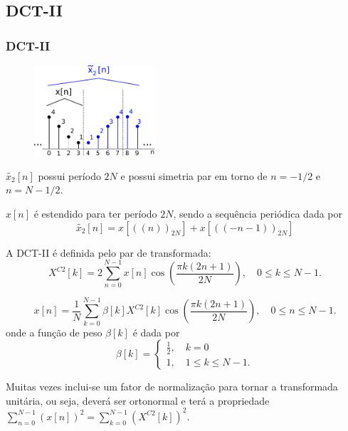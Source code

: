 \subsection{DCT-II}
\begin{frame}[allowframebreaks]
  \frametitle{DCT-II}
    \begin{figure}[ht]
    \centering
    \includegraphics[width=0.4\textwidth]{images/dct-2-ex.pdf}
    \label{fig:DCT-II-a}
    \end{figure}
    $\tilde{x_2}[n]$ possui período $2N$ e possui simetria par em torno de $n=-1/2$ e $n=N-1/2$.

    $x[n]$ é estendido para ter período $2N$, sendo a sequência periódica dada por
        \begin{equation}
        \tilde{x_2}[n] = x \left[ ((n))_{2N} \right] + x \left[ ((-n-1))_{2N} \right]
        \end{equation}

        \framebreak

        A DCT-II é definida pelo par de transformada:
        \begin{equation}
        X^{C2}[k] = 2 \sum_{n=0}^{N-1} x[n] \cos \left( \frac{\pi k (2n+1)}{2N} \right), \quad 0 \leq k \leq N-1 .
        \end{equation}

        \begin{equation}
        x[n] = \frac{1}{N} \sum_{k=0}^{N-1} \beta[k] X^{C2}[k] \cos \left( \frac{\pi k (2n+1)}{2N} \right), \quad 0 \leq n \leq N-1 .
        \end{equation}
        onde a função de peso $\beta[k]$ é dada por
        \begin{equation}
        \beta[k] = \begin{cases} \frac{1}{2} , \quad k = 0 \\ 1 , \quad 1 \leq k \leq N - 1 . \end{cases}
        \end{equation}

        \framebreak
        Muitas vezes inclui-se um fator de normalização para tornar a transformada unitária, ou seja,
        deverá ser ortonormal e terá a propriedade $\sum_{n=0}^{N-1} \left( x[n] \right)^2 = \sum_{k=0}^{N-1} \left( X^{C2} [k] \right)^2$.


\end{frame}
